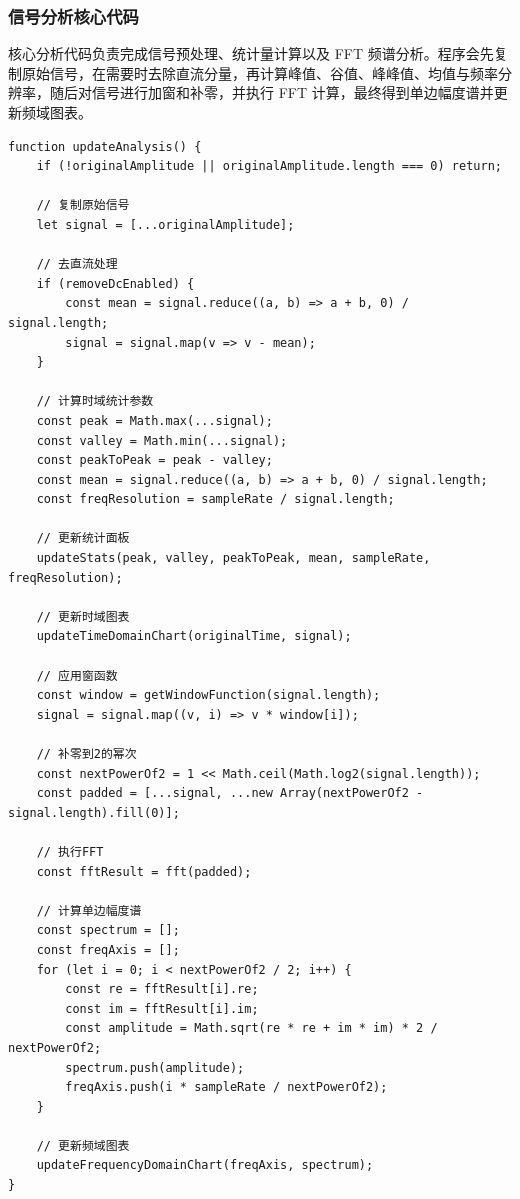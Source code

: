 \documentclass[11pt,a4paper]{ctexart}
\begin{document}
\subsubsection{信号分析核心代码}

核心分析代码负责完成信号预处理、统计量计算以及 FFT 频谱分析。程序会先复制原始信号，在需要时去除直流分量，再计算峰值、谷值、峰峰值、均值与频率分辨率，随后对信号进行加窗和补零，并执行 FFT 计算，最终得到单边幅度谱并更新频域图表。

\begin{Verbatim}[frame=single,fontsize=\small]
function updateAnalysis() {
    if (!originalAmplitude || originalAmplitude.length === 0) return;
  
    // 复制原始信号
    let signal = [...originalAmplitude];
  
    // 去直流处理
    if (removeDcEnabled) {
        const mean = signal.reduce((a, b) => a + b, 0) / signal.length;
        signal = signal.map(v => v - mean);
    }
  
    // 计算时域统计参数
    const peak = Math.max(...signal);
    const valley = Math.min(...signal);
    const peakToPeak = peak - valley;
    const mean = signal.reduce((a, b) => a + b, 0) / signal.length;
    const freqResolution = sampleRate / signal.length;
  
    // 更新统计面板
    updateStats(peak, valley, peakToPeak, mean, sampleRate, freqResolution);
  
    // 更新时域图表
    updateTimeDomainChart(originalTime, signal);
  
    // 应用窗函数
    const window = getWindowFunction(signal.length);
    signal = signal.map((v, i) => v * window[i]);
  
    // 补零到2的幂次
    const nextPowerOf2 = 1 << Math.ceil(Math.log2(signal.length));
    const padded = [...signal, ...new Array(nextPowerOf2 - signal.length).fill(0)];
  
    // 执行FFT
    const fftResult = fft(padded);
  
    // 计算单边幅度谱
    const spectrum = [];
    const freqAxis = [];
    for (let i = 0; i < nextPowerOf2 / 2; i++) {
        const re = fftResult[i].re;
        const im = fftResult[i].im;
        const amplitude = Math.sqrt(re * re + im * im) * 2 / nextPowerOf2;
        spectrum.push(amplitude);
        freqAxis.push(i * sampleRate / nextPowerOf2);
    }
  
    // 更新频域图表
    updateFrequencyDomainChart(freqAxis, spectrum);
}
\end{Verbatim}
\end{document}
